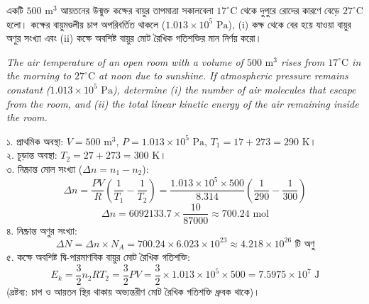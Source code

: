 \documentclass[12pt, a4paper]{article}
\begin{document}
\vspace{1.5em}



\begin{tcolorbox}[questionbox={প্রশ্ন (Question) 2}]
\noindent
একটি $500\text{ m}^3$ আয়তনের উন্মুক্ত কক্ষের বায়ুর তাপমাত্রা সকালবেলা $17^\circ\text{C}$ থেকে দুপুরে রোদের কারণে বেড়ে $27^\circ\text{C}$ হলো। কক্ষের বায়ুমণ্ডলীয় চাপ অপরিবর্তিত থাকলে ($1.013 \times 10^5\text{ Pa}$), (i) কক্ষ থেকে বের হয়ে যাওয়া বায়ুর অণুর সংখ্যা এবং (ii) কক্ষে অবশিষ্ট বায়ুর মোট রৈখিক গতিশক্তির মান নির্ণয় করো।

\vspace{0.8em}
\begin{english}
\noindent\textit{\color{darkgray}
The air temperature of an open room with a volume of $500\text{ m}^3$ rises from $17^\circ\text{C}$ in the morning to $27^\circ\text{C}$ at noon due to sunshine. If atmospheric pressure remains constant ($1.013 \times 10^5\text{ Pa}$), determine (i) the number of air molecules that escape from the room, and (ii) the total linear kinetic energy of the air remaining inside the room.
}
\end{english}
\end{tcolorbox}

\vspace{1em}

\begin{tcolorbox}[solutionbox={সমাধান (Solution)}]
\noindent
১. প্রাথমিক অবস্থা: $V = 500\text{ m}^3$, $P = 1.013 \times 10^5\text{ Pa}$, $T_1 = 17 + 273 = 290\text{ K}$। \\
২. চূড়ান্ত অবস্থা: $T_2 = 27 + 273 = 300\text{ K}$। \\
৩. নিষ্ক্রান্ত মোল সংখ্যা ($\Delta n = n_1 - n_2$):
\[ \Delta n = \frac{P V}{R} \left(\frac{1}{T_1} - \frac{1}{T_2}\right) = \frac{1.013 \times 10^5 \times 500}{8.314} \left(\frac{1}{290} - \frac{1}{300}\right) \]
\[ \Delta n = 6092133.7 \times \frac{10}{87000} \approx 700.24\text{ mol} \]
৪. নিষ্ক্রান্ত অণুর সংখ্যা:
\[ \Delta N = \Delta n \times N_A = 700.24 \times 6.023 \times 10^{23} \approx 4.218 \times 10^{26}\text{ টি অণু} \]
৫. কক্ষে অবশিষ্ট দ্বি-পারমাণবিক বায়ুর মোট রৈখিক গতিশক্তি:
\[ E_k = \frac{3}{2} n_2 R T_2 = \frac{3}{2} P V = \frac{3}{2} \times 1.013 \times 10^5 \times 500 = 7.5975 \times 10^7\text{ J} \]
(দ্রষ্টব্য: চাপ ও আয়তন স্থির থাকায় অভ্যন্তরীণ মোট রৈখিক গতিশক্তি ধ্রুবক থাকে)।
\end{tcolorbox}
\end{document}
